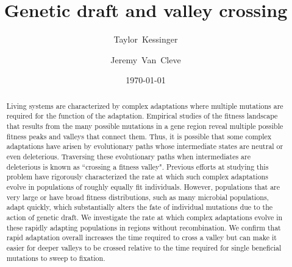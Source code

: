 \documentclass[rmp]{revtex4}
\begin{document}
\title{Genetic draft and valley crossing}
\author{Taylor~Kessinger}
\author{Jeremy~Van~Cleve}


\date{\today}

\begin{abstract}
Living systems are characterized by complex adaptations where multiple mutations are required for the function of the adaptation. Empirical studies of the fitness landscape that results from the many possible mutations in a gene region reveal multiple possible fitness peaks and valleys that connect them. Thus, it is possible that some complex adaptations have arisen by evolutionary paths whose intermediate states are neutral or even deleterious.
Traversing these evolutionary paths when intermediates are deleterious is known as ``crossing a fitness valley".
Previous efforts at studying this problem have rigorously characterized the rate at which such complex adaptations evolve in populations of roughly equally fit individuals.
However, populations that are very large or have broad fitness distributions, such as many microbial populations, adapt quickly, which substantially alters the fate of individual mutations due to the action of genetic draft.
We investigate the rate at which complex adaptations evolve in these rapidly adapting populations in regions without recombination.
We confirm that rapid adaptation overall increases the time required to cross a valley but can make it easier for deeper valleys to be crossed relative to the time required for single beneficial mutations to sweep to fixation.
\end{abstract}

\maketitle
\end{document}
